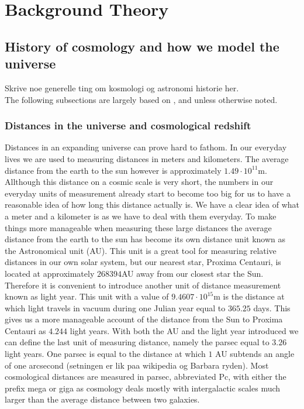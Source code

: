 \chapter{Background Theory}
\section{History of cosmology and how we model the universe}
Skrive noe generelle ting om kosmologi og astronomi historie her.\\

The following subsections are largely based on \cite[ch.7]{schneider2006extragalactic}, \cite[ch.2]{Dodelson:1282338} and \cite{ryden2017introduction} unless otherwise noted.
\subsection{Distances in the universe and cosmological redshift}\label{sec:sec_distance}
Distances in an expanding universe can prove hard to fathom. In our everyday
lives we are used to measuring distances in meters and kilometers. The
average distance from the earth to the sun however is approximately $1.49\cdot10^{11}$m.
Allthough this distance on a cosmic scale is very short, the numbers in our
everyday units of measurement already start to become too big for us to have a
reasonable idea of how long this distance actually is. We have a clear idea of
what a meter and a kilometer is as we have to deal with them everyday. To make
things more manageable when measuring these large distances the average distance
from the earth to the sun has become its own distance unit known as the
Astronomical unit (AU). This unit is a great tool for measuring relative
distances in our own solar system, but our nearest star, Proxima Centauri, is
located at approximately $268394$AU away from our closest star the Sun.
Therefore it is convenient to introduce another unit of distance measurement known as light year. This unit with a value of $9.4607\cdot10^{15}$m is the distance at
which light travels in vacuum during one Julian year equal to $365.25$ days.
This gives us a more manageable account of the distance from the Sun to Proxima
Centauri as $4.244$ light years. With both the AU and the light year introduced
we can define the last unit of measuring distance, namely the parsec equal to $3.26$
light years. One parsec is equal to the distance at which $1$ AU subtends an angle
of one arcsecond (setningen er lik paa wikipedia og Barbara ryden). Most
cosmological distances are measured in parsec, abbreviated Pc, with either the
prefix mega or giga as cosmology deals mostly with intergalactic scales much
larger than the average distance between two galaxies.\\

